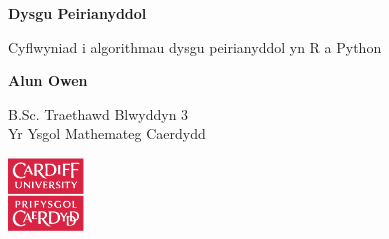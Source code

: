 \begin{titlepage}
    \begin{center}
        \vspace*{5cm}

        \textbf{Dysgu Peirianyddol}

        \vspace{0.5cm}
        Cyflwyniad i algorithmau dysgu peirianyddol yn R a Python

        \vspace{1.5cm}

        \textbf{Alun Owen}

        \vfill

        B.Sc. Traethawd Blwyddyn 3\\

        \vspace{0.5cm}
        Yr Ysgol Mathemateg Caerdydd

        \vspace{1.5cm}

        \includegraphics[width=0.15\textwidth]{../img/cflogo.pdf}


    \end{center}
\end{titlepage}